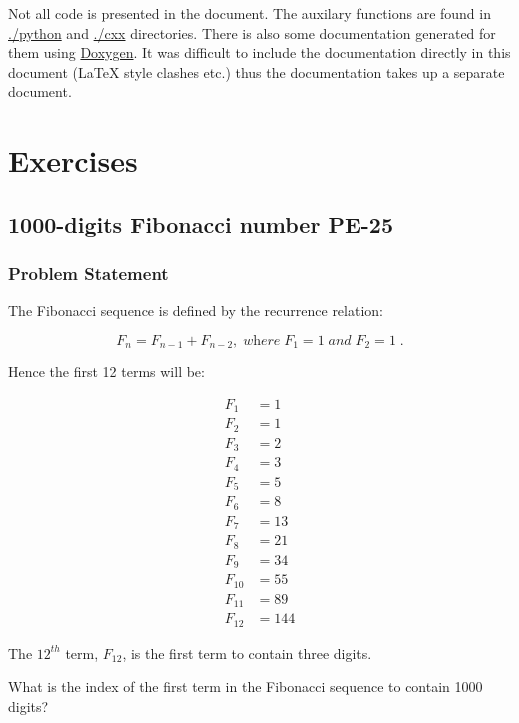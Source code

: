 \documentclass[11pt]{article}
\begin{document}
Not all code is presented in the document.  The auxilary functions are found
in \url{./python} and \url{./cxx} directories.  There is also some documentation generated
for them using \href{http://www.stack.nl/~dimitri/doxygen/}{Doxygen}. It was difficult to include the documentation directly
in this document (\LaTeX{} style clashes etc.) thus the documentation takes up a
separate document.

\section{Exercises}
\label{sec:orgheadline21}
\subsection{1000-digits Fibonacci number PE-25}
\label{sec:orgheadline5}
\subsubsection{Problem Statement}
\label{sec:orgheadline2}
The Fibonacci sequence is defined by the recurrence relation:

\begin{equation*}
  F_n = F_{n-1} + F_{n-2},\; \textit{where}\; F_1 = 1\; \textit{and} \; F_2 = 1\;.
\end{equation*}


Hence the first 12 terms will be:

\begin{align*}
  F_1    &= 1   \\
  F_2    &= 1   \\
  F_3    &= 2   \\
  F_4    &= 3   \\
  F_5    &= 5   \\
  F_6    &= 8   \\
  F_7    &= 13  \\
  F_8    &= 21  \\
  F_9    &= 34  \\
  F_{10} &= 55  \\
  F_{11} &= 89  \\
  F_{12} &= 144
\end{align*}


The \(12^{th}\) term, \(F_{12}\), is the first term to contain three digits.

What is the index of the first term in the Fibonacci sequence 
to contain 1000 digits?
\end{document}
